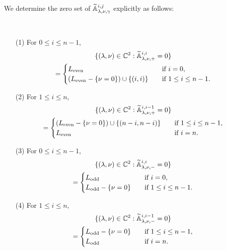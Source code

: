 We determine the zero set of ${\widetilde{\mathbb{A}}}_{{\lambda},{\nu},{\gamma}}^{{i,j}}$
 explicitly as follows:
\begin{theorem}
\label{thm:161243}
~~~~~
\begin{enumerate}
\item[{\rm{(1)}}]
For $0 \le i \le n-1$, 
\begin{multline*}
\{(\lambda, \nu) \in {\mathbb{C}}^2
:
{\widetilde{\mathbb{A}}}_{{\lambda},{\nu},{+}}^{{i,i}} =0\}
\\
= 
\begin{cases}
L_{\operatorname{even}}
\quad
&
\text{if $i=0$}, 
\\
(L_{\operatorname{even}} - \{\nu=0\}) \cup \{(i,i)\}
\quad
&
\text{if $1 \le i \le n-1$}.  
\end{cases}
\end{multline*}
\item[{\rm{(2)}}]
For $1 \le i \le n$, 
\begin{multline*}
\{(\lambda, \nu) \in {\mathbb{C}}^2
:
{\widetilde{\mathbb{A}}}_{{\lambda},{\nu},{+}}^{{i,i-1}} =0\}
\\
=
\begin{cases}
(L_{\operatorname{even}}- \{\nu=0\}) \cup \{(n-i,n-i)\}
\quad
&
\text{if $1 \le i \le n-1$}, 
\\
L_{\operatorname{even}} 
\quad
&
\text{if $i=n$}.  
\end{cases}
\end{multline*}
\item[{\rm{(3)}}]
For $0 \le i \le n-1$, 
\begin{multline*}
\{(\lambda, \nu) \in {\mathbb{C}}^2
:
{\widetilde{\mathbb{A}}}_{{\lambda},{\nu},{-}}^{{i,i}} =0\}
\\
= 
\begin{cases}
L_{\operatorname{odd}}
\quad
&
\text{if $i=0$}, 
\\
L_{\operatorname{odd}}- \{\nu=0\} 
\quad
&
\text{if $1 \le i \le n-1$}.  
\end{cases}
\end{multline*}
\item[{\rm{(4)}}]
For $1 \le i \le n$, 
\begin{multline*}
\{(\lambda, \nu) \in {\mathbb{C}}^2
:
{\widetilde{\mathbb{A}}}_{{\lambda},{\nu},{-}}^{{i,i-1}} =0\}
\\
=
\begin{cases}
L_{\operatorname{odd}}- \{\nu=0\}
\quad
&
\text{if $1 \le i \le n-1$}, 
\\
L_{\operatorname{odd}} 
\quad
&
\text{if $i=n$}.  
\end{cases}
\end{multline*}
\end{enumerate}
\end{theorem}



